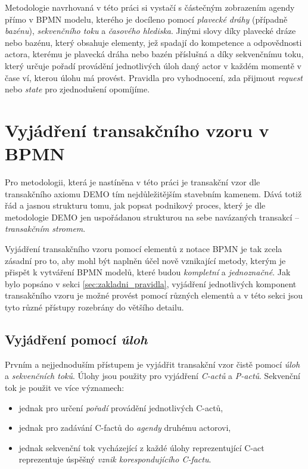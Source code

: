 \documentclass[]{article}
\begin{document}
Metodologie navrhovaná v této práci si vystačí s částečným zobrazením agendy přímo v BPMN modelu, kterého je docíleno pomocí \textit{plavecké dráhy} (případně \textit{bazénu}), \textit{sekvenčního toku} a \textit{časového hlediska}. Jinými slovy díky plavecké dráze nebo bazénu, který obsahuje elementy, jež spadají do kompetence a odpovědnosti actora, kterému je plavecká dráha nebo bazén příslušná a díky sekvenčnímu toku, který určuje pořadí provádění jednotlivých úloh daný actor v každém momentě v čase ví, kterou úlohu má provést. Pravidla pro vyhodnocení, zda přijmout \textit{request} nebo \textit{state} pro zjednodušení opomíjíme.

\section{Vyjádření transakčního vzoru v BPMN} \label{sec:vyjadreni_trans_vzor}
Pro metodologii, která je nastíněna v této práci je transakční vzor dle transakčního axiomu DEMO tím nejdůležitějším stavebním kamenem. Dává totiž řád a jasnou strukturu tomu, jak popsat podnikový proces, který je dle metodologie DEMO jen uspořádanou strukturou na sebe navázaných transakcí – \textit{transakčním stromem}.

Vyjádření transakčního vzoru pomocí elementů z notace BPMN je tak zcela zásadní pro to, aby mohl být naplněn účel nově vznikající metody, kterým je přispět k vytváření BPMN modelů, které budou \textit{kompletní} a \textit{jednoznačné}. Jak bylo popsáno v sekci \ref{sec:zakladni_pravidla}, vyjádření jednotlivých komponent transakčního vzoru je možné provést pomocí různých elementů a v této sekci jsou tyto různé přístupy rozebrány do většího detailu. 

\subsection{Vyjádření pomocí \textit{úloh}} \label{sec:vyjadreni_ulohy}
Prvním a nejjednoduším přístupem je vyjádřit transakční vzor čistě pomocí \textit{úloh} a \textit{sekvenčních toků}. Úlohy jsou použity pro vyjádření \textit{C-actů} a \textit{P-actů}. Sekvenční tok je použit ve více významech:

\begin{itemize}
\item jednak pro určení \textit{pořadí} provádění jednotlivých C-actů,
\item jednak pro zadávání C-factů do \textit{agendy} druhému actorovi,
\item jednak sekvenční tok vycházející z každé úlohy reprezentující C-act reprezentuje úspěšný \textit{vznik korespondujícího C-factu}.
\end{itemize}
\end{document}
